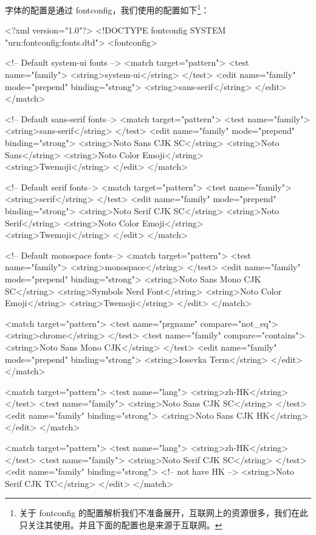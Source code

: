 字体的配置是通过 fontconfig，我们使用的配置如下\footnote{关于 fontconfig 的配置解析我们不准备展开，互联网上的资源很多，我们在此只关注其使用。并且下面的配置也是来源于互联网。}：
\begin{lstcode}
<?xml version="1.0"?>
<!DOCTYPE fontconfig SYSTEM "urn:fontconfig:fonts.dtd">
<fontconfig>

  <!-- Default system-ui fonts -->
  <match target="pattern">
    <test name="family">
      <string>system-ui</string>
    </test>
    <edit name="family" mode="prepend" binding="strong">
      <string>sans-serif</string>
    </edit>
  </match>

  <!-- Default sans-serif fonts-->
  <match target="pattern">
    <test name="family">
      <string>sans-serif</string>
    </test>
    <edit name="family" mode="prepend" binding="strong">
      <string>Noto Sans CJK SC</string>
      <string>Noto Sans</string>
      <string>Noto Color Emoji</string>
      <string>Twemoji</string>
    </edit>
  </match>

  <!-- Default serif fonts-->
  <match target="pattern">
    <test name="family">
      <string>serif</string>
    </test>
    <edit name="family" mode="prepend" binding="strong">
      <string>Noto Serif CJK SC</string>
      <string>Noto Serif</string>
      <string>Noto Color Emoji</string>
      <string>Twemoji</string>
    </edit>
  </match>

  <!-- Default monospace fonts-->
  <match target="pattern">
    <test name="family">
      <string>monospace</string>
    </test>
    <edit name="family" mode="prepend" binding="strong">
      <string>Noto Sans Mono CJK SC</string>
      <string>Symbols Nerd Font</string>
      <string>Noto Color Emoji</string>
      <string>Twemoji</string>
    </edit>
  </match>

  <match target="pattern">
    <test name="prgname" compare="not_eq">
      <string>chrome</string>
    </test>
    <test name="family" compare="contains">
      <string>Noto Sans Mono CJK</string>
    </test>
    <edit name="family" mode="prepend" binding="strong">
      <string>Iosevka Term</string>
    </edit>
  </match>

  
  <match target="pattern">
    <test name="lang">
      <string>zh-HK</string>
    </test>
    <test name="family">
      <string>Noto Sans CJK SC</string>
    </test>
    <edit name="family" binding="strong">
      <string>Noto Sans CJK HK</string>
    </edit>
  </match>

  <match target="pattern">
    <test name="lang">
      <string>zh-HK</string>
    </test>
    <test name="family">
      <string>Noto Serif CJK SC</string>
    </test>
    <edit name="family" binding="strong">
      <!-- not have HK -->
      <string>Noto Serif CJK TC</string>
    </edit>
  </match>


\end{lstcode}

